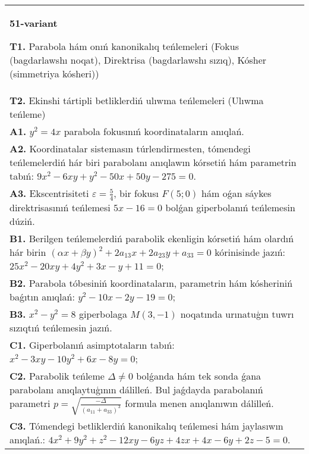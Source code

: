 \documentclass{article}
\begin{document}
\begin{tabular}{m{17cm}}
\textbf{51-variant}
\newline

\textbf{T1.} Parabola hám onıń kanonikalıq teńlemeleri (Fokus (bagdarlawshı noqat), Direktrisa (bagdarlawshı sızıq), Kósher (simmetriya kósheri)) \\
\textbf{T2.} Ekinshi tártipli betliklerdiń ulıwma teńlemeleri (Ulıwma teńleme) \\
\textbf{A1.} $y^2=4 x$ parabola fokusınıń koordinataların anıqlań. \\
\textbf{A2.} Koordinatalar sistemasın túrlendirmesten, tómendegi teńlemelerdiń hár biri parabolanı anıqlawın kórsetiń hám parametrin tabıń: $9 x^2-6 x y+y^2-50 x+50 y-275=0$. \\
\textbf{A3.} Ekscentrisiteti $\varepsilon=\frac{5}{4}$, bir fokusı $F (5; 0) $ hám oǵan sáykes direktrisasınıń teńlemesi $5x-16=0$ bolǵan giperbolanıń teńlemesin dúziń. \\
\textbf{B1.} Berilgen teńlemelerdiń parabolik ekenligin kórsetiń hám olardıń hár birin $(\alpha x+\beta y)^2+2 a_{13} x+2 a_{23} y+a_{33}=0$ kórinisinde jazıń: $25 x^2-20 x y+4 y^2+3 x-y+11=0$; \\
\textbf{B2.} Parabola tóbesiniń koordinataların, parametrin hám kósheriniń baǵıtın anıqlań: $y^2-10 x-2 y-19=0$; \\
\textbf{B3.} $x^2-y^2=8$ giperbolaga $M(3,-1)$ noqatında urınatuģın tuwrı sızıqtıń teńlemesin jazıń. \\
\textbf{C1.} Giperbolanıń asimptotaların tabıń: $x^2-3 x y-10 y^2+6 x-8 y=0$; \\
\textbf{C2.} Parabolik teńleme $\Delta \neq 0$ bolǵanda hám tek sonda ǵana parabolanı anıqlaytuģının dálilleń. Bul jaǵdayda parabolanıń parametri $p=\sqrt{\frac{-\Delta}{ (a_{11}+a_{33}) ^3}}$ formula menen anıqlanıwın dálilleń. \\
\textbf{C3.} Tómendegi betliklerdiń kanonikalıq teńlemesi hám jaylasıwın anıqlań.: $4 x^2+9 y^2+z^2-12 x y-6 y z+4 z x+4 x-6 y+2 z-5=0$. \\

\end{tabular}
\vspace{1cm}
\end{document}

